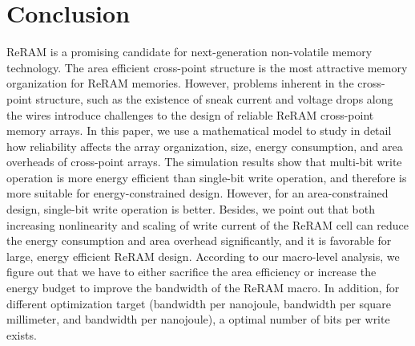 \vspace{-5pt}
\section{Conclusion}\label{sec:conclusion}
ReRAM is a promising candidate for next-generation non-volatile memory
technology. The area efficient cross-point structure is the most
attractive memory organization for ReRAM memories. However, problems
inherent in the cross-point structure, such as the existence of sneak
current and voltage drops along the wires introduce challenges to the
design of reliable ReRAM cross-point memory arrays. In this paper, we use
a mathematical model to study in detail how reliability affects the array
organization, size, energy consumption, and area overheads of cross-point
arrays. The simulation results show that multi-bit write operation is more
energy efficient than single-bit write operation, and therefore is more
suitable for energy-constrained design. However, for an area-constrained
design, single-bit write operation is better. Besides, we point out that
both increasing nonlinearity and scaling of write current of the ReRAM
cell can reduce the energy consumption and area overhead significantly,
and it is favorable for large, energy efficient ReRAM design. According to
our macro-level analysis, we figure out that we have to either sacrifice
the area efficiency or increase the energy budget to improve the bandwidth
of the ReRAM macro. In addition, for different optimization target
(bandwidth per nanojoule, bandwidth per square millimeter, and bandwidth
per nanojoule), a optimal number of bits per write exists.
